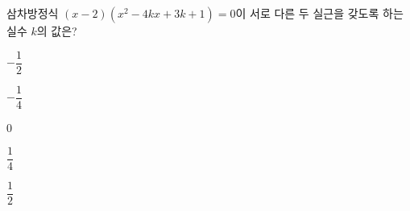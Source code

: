 삼차방정식 $(x-2)(x^2-4kx+3k+1)=0$이 서로 다른 두 실근을 갖도록 하는 실수 $k$의 값은?
\begin{choices32}{\rule[-3ex]{0pt}{8ex}$-\dfrac{1}{2}$}{\rule[-3ex]{0pt}{8ex}$-\dfrac{1}{4}$}{\rule[-3ex]{0pt}{8ex}$0$}{\rule[-3ex]{0pt}{8ex}$\dfrac{1}{4}$}{\rule[-3ex]{0pt}{8ex}$\dfrac{1}{2}$}\end{choices32}
